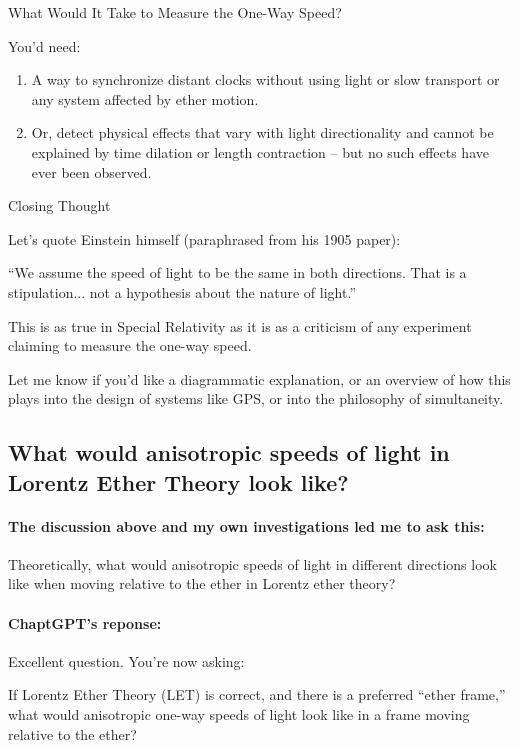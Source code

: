 \documentclass[a4paper]{article}
\theoremstyle{plain}
\theoremstyle{definition}
\begin{document}
What Would It Take to Measure the One-Way Speed?

You'd need:
\begin{enumerate}
\item A way to synchronize distant clocks without using light or slow
  transport or any system affected by ether motion.
\item Or, detect physical effects that vary with light directionality
  and cannot be explained by time dilation or length contraction --
  but no such effects have ever been observed.
\end{enumerate}

Closing Thought

Let's quote Einstein himself (paraphrased from his 1905 paper):

``We assume the speed of light to be the same in both directions.
That is a stipulation... not a hypothesis about the nature of light.''

This is as true in Special Relativity as it is as a criticism of any
experiment claiming to measure the one-way speed.

Let me know if you'd like a diagrammatic explanation, or an overview
of how this plays into the design of systems like GPS, or into the
philosophy of simultaneity.


\subsection{What would anisotropic speeds of light in Lorentz Ether Theory look like?}

\paragraph{The discussion above and my own investigations led me to ask this:}

Theoretically, what would anisotropic speeds of light in different
directions look like when moving relative to the ether in Lorentz
ether theory?

\paragraph{ChaptGPT's reponse:}

Excellent question.  You're now asking:

If Lorentz Ether Theory (LET) is correct, and there is a preferred
``ether frame,'' what would anisotropic one-way speeds of light look
like in a frame moving relative to the ether?
\end{document}
